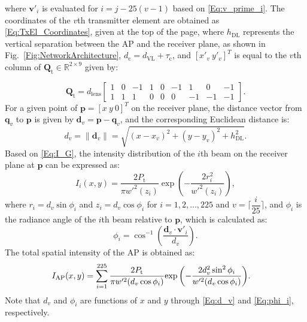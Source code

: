 \documentclass[lettersize,journal]{IEEEtran}
\begin{document}
where $\mathbf{v}'_i$ is evaluated for $i=j-25(v-1)$ based on \eqref{Eq:v_prime_i}. The coordinates of the $v$th transmitter element are obtained as \eqref{Eq:TxEl_Coordinates}, given at the top of the page, where $h_\mathrm{DL}$ represents the vertical separation between the \ac{AP} and the receiver plane, as shown in Fig.~\ref{Fig:NetworkArchitecture}, $d_\mathrm{c}=d_\mathrm{VL}+\tau_\mathrm{c}$, and $\left[x'_v~y'_v\right]^T$ is equal to the $v$th column of $\mathbf{Q}_\mathrm{t}\in\mathbb{R}^{2\times9}$ given by:
%
\addtocounter{equation}{1}
\begin{equation}
    \mathbf{Q}_\mathrm{t} = d_\mathrm{lens}\left[\begin{matrix}
                            1 & 0 & -1 & 1 & 0  & -1 & 1  & 0  & -1 \\ 
                            1 & 1 & 1  & 0 & 0  & 0  & -1 & -1 & -1
                            \end{matrix}\right].
\end{equation}
%
For a given point of $\mathbf{p}=[x~y~0]^T$ on the receiver plane, the distance vector from $\mathbf{q}_v$ to $\mathbf{p}$ is given by $\mathbf{d}_v=\mathbf{p}-\mathbf{q}_v$, and the corresponding Euclidean distance is:
%
\begin{equation}
    d_v = \lVert\mathbf{d}_v\rVert=\sqrt{(x-x_v)^2+(y-y_v)^2+h_\mathrm{DL}^2}.
    \label{Eq:d_v}
\end{equation}
%
Based on \eqref{Eq:I_G}, the intensity distribution of the $i$th beam on the receiver plane at $\mathbf{p}$ can be expressed as:
%
\begin{equation}
	I_i(x,y) = \frac{2P_\mathrm{t}}{\pi w'^2(z_i)}{\exp{\left(-\frac{2r_i^2}{w'^2(z_i)}\right)}},
    \label{Eq:I_i}
\end{equation}
%
where $r_i=d_v\sin\phi_i$ and $z_i=d_v\cos\phi_i$ for $i=1,2,\dots,225$ and $v=\Big\lceil\dfrac{i}{25}\Big\rceil$, and $\phi_i$ is the radiance angle of the $i$th beam relative to $\mathbf{p}$, which is calculated as:
\begin{equation}
    \phi_i = \cos^{-1}\left(\frac{\mathbf{d}_v{\cdot}\mathbf{v}'_i}{d_v}\right).
    \label{Eq:phi_i}
\end{equation}
The total spatial intensity of the \ac{AP} is obtained as:
\begin{equation}
    \mkern-18mu I_\mathrm{AP}(x,y) = \sum_{i=1}^{225}\frac{2P_\mathrm{t}}{\pi w'^2(d_v\cos\phi_i)}{\exp{\left(-\frac{2d_v^2\sin^2\phi_i}{w'^2(d_v\cos\phi_i)}\right)}}.
    \label{Eq:I_AP}
\end{equation}
Note that $d_v$ and $\phi_i$ are functions of $x$ and $y$ through \eqref{Eq:d_v} and \eqref{Eq:phi_i}, respectively.
\end{document}
